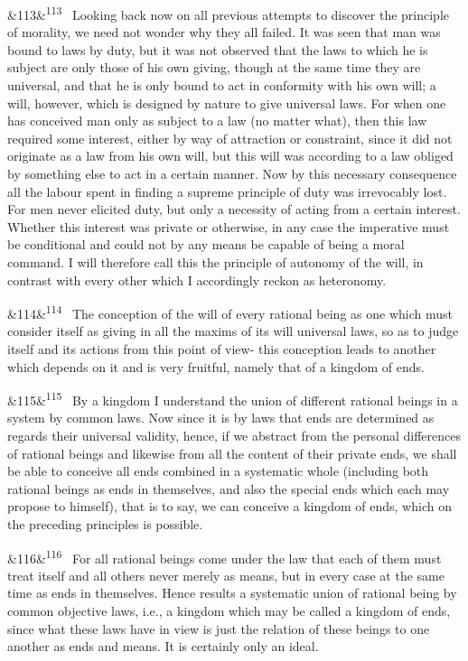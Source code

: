 \documentclass[12pt]{article}
\newcommand{\para}[1][]{\par\noindent\ifx&#1&\else\textsuperscript{\footnotesize #1}~\fi}
\begin{document}
\para[113] Looking back now on all previous attempts to discover the principle of morality, we need not wonder why they all failed. It was seen that man was bound to laws by duty, but it was not observed that the laws to which he is subject are only those of his own giving, though at the same time they are universal, and that he is only bound to act in conformity with his own will; a will, however, which is designed by nature to give universal laws. For when one has conceived man only as subject to a law (no matter what), then this law required some interest, either by way of attraction or constraint, since it did not originate as a law from his own will, but this will was according to a law obliged by something else to act in a certain manner. Now by this necessary consequence all the labour spent in finding a supreme principle of duty was irrevocably lost. For men never elicited duty, but only a necessity of acting from a certain interest. Whether this interest was private or otherwise, in any case the imperative must be conditional and could not by any means be capable of being a moral command. I will therefore call this the principle of autonomy of the will, in contrast with every other which I accordingly reckon as heteronomy.

\para[114] The conception of the will of every rational being as one which must consider itself as giving in all the maxims of its will universal laws, so as to judge itself and its actions from this point of view- this conception leads to another which depends on it and is very fruitful, namely that of a kingdom of ends.

\para[115] By a kingdom I understand the union of different rational beings in a system by common laws. Now since it is by laws that ends are determined as regards their universal validity, hence, if we abstract from the personal differences of rational beings and likewise from all the content of their private ends, we shall be able to conceive all ends combined in a systematic whole (including both rational beings as ends in themselves, and also the special ends which each may propose to himself), that is to say, we can conceive a kingdom of ends, which on the preceding principles is possible.

\para[116] For all rational beings come under the law that each of them must treat itself and all others never merely as means, but in every case at the same time as ends in themselves. Hence results a systematic union of rational being by common objective laws, i.e., a kingdom which may be called a kingdom of ends, since what these laws have in view is just the relation of these beings to one another as ends and means. It is certainly only an ideal.
\end{document}
